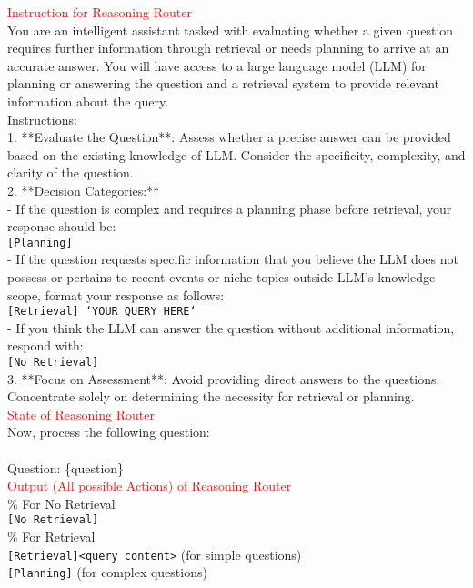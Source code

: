 \begin{tcolorbox}[title=Reasoning Router,width=\linewidth, breakable]
\begin{small}
\textcolor{red}{Instruction for Reasoning Router}\\
You are an intelligent assistant tasked with evaluating whether a given question requires further information through retrieval or needs planning to arrive at an accurate answer. You will have access to a large language model (LLM) for planning or answering the question and a retrieval system to provide relevant information about the query. \\

Instructions:\\
1. **Evaluate the Question**: Assess whether a precise answer can be provided based on the existing knowledge of LLM. Consider the specificity, complexity, and clarity of the question.\\
2. **Decision Categories:**\\
    - If the question is complex and requires a planning phase before retrieval, your response should be:\\
    \texttt{[Planning]}\\
    - If the question requests specific information that you believe the LLM does not possess or pertains to recent events or niche topics outside LLM's knowledge scope, format your response as follows: \\
    \texttt{[Retrieval] `YOUR QUERY HERE`}\\
    - If you think the LLM can answer the question without additional information, respond with:\\
    \texttt{[No Retrieval]}\\
3. **Focus on Assessment**: Avoid providing direct answers to the questions. Concentrate solely on determining the necessity for retrieval or planning.\\

\textcolor{red}{State of Reasoning Router}\\
Now, process the following question:\\
\\
Question: \{question\}\\

\textcolor{red}{Output (All possible Actions) of Reasoning Router}\\
\% For No Retrieval\\
\texttt{[No Retrieval]}\\
\% For Retrieval\\
\texttt{[Retrieval]<query content>} (for simple questions)\\
\texttt{[Planning]} (for complex questions)
\end{small}
\end{tcolorbox}
